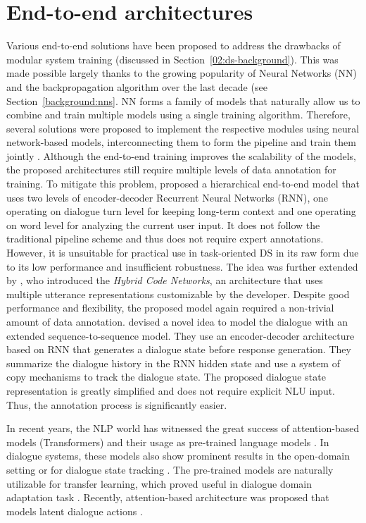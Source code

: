 \section{End-to-end architectures}
\label{relwork:end-to-end}
Various end-to-end solutions have been proposed to address the drawbacks of modular system training (discussed in Section~\ref{02:ds-background}).
This was made possible largely thanks to the growing popularity of Neural Networks (NN) and the backpropagation algorithm over the last decade (see Section~\ref{background:nns}.
NN forms a family of models that naturally allow us to combine and train multiple models using a single training algorithm.
Therefore, several solutions were proposed to implement the respective modules using neural network-based models, interconnecting them to form the pipeline and train them jointly \cite{li-etal-2017-end,wen-etal-2017-network}.
Although the end-to-end training improves the scalability of the models, the proposed architectures still require multiple levels of data annotation for training.
To mitigate this problem, \citet{serban2016building} proposed a hierarchical end-to-end model that uses two levels of encoder-decoder Recurrent Neural Networks (RNN), one operating on dialogue turn level for keeping long-term context and one operating on word level for analyzing the current user input.
It does not follow the traditional pipeline scheme and thus does not require expert annotations.
However, it is unsuitable for practical use in task-oriented DS in its raw form due to its low performance and insufficient robustness.
The idea was further extended by \citet{williams2017hybrid}, who introduced the \textit{Hybrid Code Networks}, an architecture that uses multiple utterance representations customizable by the developer.
Despite good performance and flexibility, the proposed model again required a non-trivial amount of data annotation.
\citet{lei2018sequicity} devised a novel idea to model the dialogue with an extended sequence-to-sequence model.
\label{sec:sequicity}
They use an encoder-decoder architecture based on RNN that generates a dialogue state before response generation.
They summarize the dialogue history in the RNN hidden state and use a system of copy mechanisms to track the dialogue state.
The proposed dialogue state representation is greatly simplified and does not require explicit NLU input.
Thus, the annotation process is significantly easier.

In recent years, the NLP world has witnessed the great success of attention-based models (Transformers) \cite{vaswani2017attention} and their usage as pre-trained language models \cite{devlin-etal-2019-bert}.
In dialogue systems, these models also show prominent results in the open-domain setting \cite{DBLP:journals/corr/abs-1901-08149} or for dialogue state tracking \cite{chao2019bert}.
The pre-trained models are naturally utilizable for transfer learning, which proved useful in dialogue domain adaptation task \cite{shalyminov-etal-2019-shot}.
Recently, attention-based architecture was proposed that models latent dialogue actions \cite{bao2019plato}.

